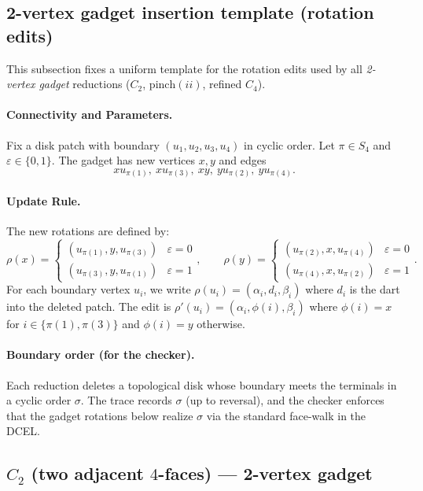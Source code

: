 \documentclass[12pt]{article}
\theoremstyle{definition}
\newcommand{\RefinedCFourGadgetVertices}{2}
\newcommand{\CtwoGadgetVertices}{2}
\begin{document}
\subsection{\CtwoGadgetVertices-vertex gadget insertion template (rotation edits)}
\label{app:template-2v}

This subsection fixes a uniform template for the rotation edits used by all \emph{\RefinedCFourGadgetVertices-vertex gadget} reductions ($C_2$, $\mathrm{pinch}(ii)$, refined $C_4$). 

\paragraph{Connectivity and Parameters.}
Fix a disk patch with boundary $(u_1,u_2,u_3,u_4)$ in cyclic order.
Let $\pi\in S_4$ and $\varepsilon\in\{0,1\}$. The gadget has new vertices $x,y$ and edges
\[ xu_{\pi(1)},\ xu_{\pi(3)},\ xy,\ yu_{\pi(2)},\ yu_{\pi(4)}. \]

\paragraph{Update Rule.}
The new rotations are defined by:
\[ \rho(x)= \begin{cases} (u_{\pi(1)},y,u_{\pi(3)}) & \varepsilon=0 \\ (u_{\pi(3)},y,u_{\pi(1)}) & \varepsilon=1 \end{cases},\qquad \rho(y)= \begin{cases} (u_{\pi(2)},x,u_{\pi(4)}) & \varepsilon=0 \\ (u_{\pi(4)},x,u_{\pi(2)}) & \varepsilon=1 \end{cases}. \]
For each boundary vertex $u_i$, we write $\rho(u_i) = (\alpha_i, d_i, \beta_i)$ where $d_i$ is the dart into the deleted patch. The edit is $\rho'(u_i) = (\alpha_i, \phi(i), \beta_i)$ where $\phi(i)=x$ for $i\in\{\pi(1),\pi(3)\}$ and $\phi(i)=y$ otherwise.

\paragraph{Boundary order (for the checker).}
Each reduction deletes a topological disk whose boundary meets the terminals in a cyclic order
$\sigma$. The trace records $\sigma$ (up to reversal), and the checker enforces that the gadget
rotations below realize $\sigma$ via the standard face-walk in the DCEL.


\subsection{$C_2$ (two adjacent $4$-faces) --- \CtwoGadgetVertices-vertex gadget}
\label{app:rot-c2}
\end{document}
